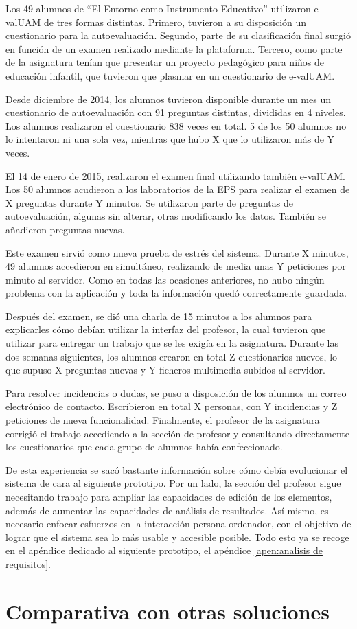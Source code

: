 Los 49 alumnos de ``El Entorno como Instrumento Educativo'' utilizaron e-valUAM de tres formas distintas. Primero, tuvieron a su disposición un cuestionario para la autoevaluación. Segundo, parte de su clasificación final surgió en función de un examen realizado mediante la plataforma. Tercero, como parte de la asignatura tenían que presentar un proyecto pedagógico para niños de educación infantil, que tuvieron que plasmar en un cuestionario de e-valUAM. 

Desde diciembre de 2014, los alumnos tuvieron disponible durante un mes un cuestionario de autoevaluación con 91 preguntas distintas, divididas en 4 niveles. Los alumnos realizaron el cuestionario 838 veces en total. 5 de los 50 alumnos no lo intentaron ni una sola vez, mientras que hubo X que lo utilizaron más de Y veces.

El 14 de enero de 2015, realizaron el examen final utilizando también e-valUAM. Los 50 alumnos acudieron a los laboratorios de la EPS para realizar el examen de X preguntas durante Y minutos. Se utilizaron parte de preguntas de autoevaluación, algunas sin alterar, otras modificando los datos. También se añadieron preguntas nuevas.

Este examen sirvió como nueva prueba de estrés del sistema. Durante X minutos, 49 alumnos accedieron en simultáneo, realizando de media unas Y peticiones por minuto al servidor. Como en todas las ocasiones anteriores, no hubo ningún problema con la aplicación y toda la información quedó correctamente guardada.

Después del examen, se dió una charla de 15 minutos a los alumnos para explicarles cómo debían utilizar la interfaz del profesor, la cual tuvieron que utilizar para entregar un trabajo que se les exigía en la asignatura. Durante las dos semanas siguientes, los alumnos crearon en total Z cuestionarios nuevos, lo que supuso X preguntas nuevas y Y ficheros multimedia subidos al servidor. 

Para resolver incidencias o dudas, se puso a disposición de los alumnos un correo electrónico de contacto. Escribieron en total X personas, con Y incidencias y Z peticiones de nueva funcionalidad. Finalmente, el profesor de la asignatura corrigió el trabajo accediendo a la sección de profesor y consultando directamente los cuestionarios que cada grupo de alumnos había confeccionado.

De esta experiencia se sacó bastante información sobre cómo debía evolucionar el sistema de cara al siguiente prototipo. Por un lado, la sección del profesor sigue necesitando trabajo para ampliar las capacidades de edición de los elementos, además de aumentar las capacidades de análisis de resultados. Así mismo, es necesario enfocar esfuerzos en la interacción persona ordenador, con el objetivo de lograr que el sistema sea lo más usable y accesible posible. Todo esto ya se recoge en el apéndice dedicado al siguiente prototipo, el apéndice \ref{apen:analisis de requisitos}.


\section{Comparativa con otras soluciones}